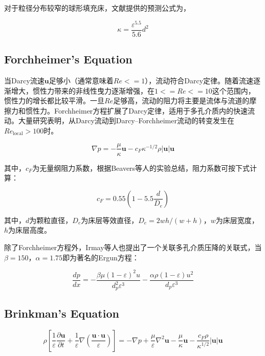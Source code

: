 对于粒径分布较窄的球形填充床，文献提供的预测公式为，

\begin{equation}
\kappa = \frac{\varepsilon^5.5}{5.6}d^2
\end{equation}

\subsection{Forchheimer's Equation}

当Darcy流速$ \bm{u} $足够小（通常意味着$ Re<=1 $），流动符合Darcy定律。随着流速逐渐增大，惯性力带来的非线性曳力逐渐增强，在$ 1<=Re<=10 $这个范围内，惯性力的增长都比较平滑。一旦$ Re $足够高，流动的阻力将主要是流体与流道的摩擦力和惯性力。Forchheimer方程扩展了Darcy定律，适用于多孔介质内的快速流动。大量研究表明，从Darcy流动到Darcy–Forchheimer流动的转变发生在$ Re_{\text{local}}>100 $时。

\begin{equation}\label{Forchheimer}
\nabla p = -\frac{\mu}{\kappa}\bm{u} - c_F \kappa^{-1/2}\rho|\bm{u}|\bm{u}
\end{equation}

其中，$ c_F $为无量纲阻力系数，根据Beavers等人的实验总结，阻力系数可按下式计算：

\begin{equation}
c_F = 0.55 \left( 1-5.5\frac{d}{D_e} \right)
\end{equation}

其中，$ d $为颗粒直径，$ D_e $为床层等效直径，$ D_e=2wh/(w+h) $，$ w $为床层宽度，$ h $为床层高度。

除了Forchheimer方程外，Irmay等人也提出了一个关联多孔介质压降的关联式，当$ \beta=150 $，$ \alpha=1.75 $即为著名的Ergun方程：

\begin{equation}\label{Irmay}
\frac{dp}{dx}=-\frac{\beta\mu(1-\varepsilon)^2 u}{d_p^2\varepsilon^3}-\frac{\alpha\rho(1-\varepsilon)u^2}{d_p\varepsilon^3}
\end{equation}

\subsection{Brinkman's Equation}

\begin{equation}\label{Brinkman}
\rho\left[ \frac{1}{\varepsilon}\frac{\partial \bm{u}}{\partial t} + \frac{1}{\varepsilon}\nabla\left( \frac{\bm{u\cdot u}}{\varepsilon} \right) \right] = -\nabla p + \frac{\mu}{\varepsilon}\nabla^2\bm{u}-\frac{\mu}{\kappa}\bm{u}-\frac{c_F\rho}{\kappa^{1/2}}|\bm{u}|\bm{u}
\end{equation}

